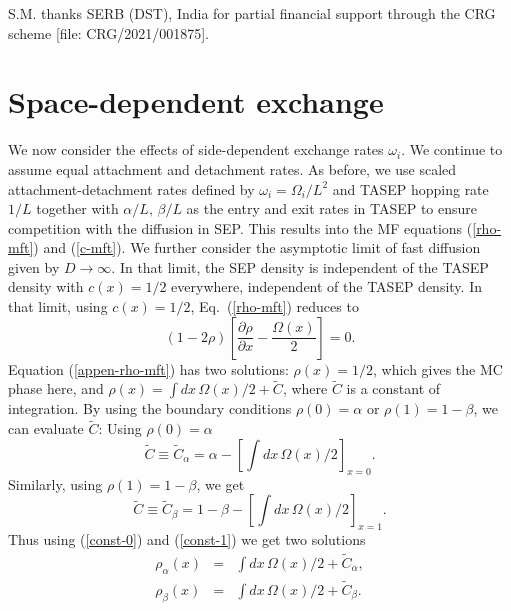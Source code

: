 \documentclass[aps,pre,twocolumn,superscriptaddress,amsmath,amssymb,longbibliography,floatfix]{revtex4}
\begin{document}
{S.M. thanks SERB (DST), India for partial financial support through the CRG scheme [file: CRG/2021/001875].

\appendix

\section{Space-dependent exchange}

We now consider the effects of side-dependent exchange rates $\omega_i$. {We continue to assume equal attachment and detachment rates. As before, we use scaled attachment-detachment rates defined by $\omega_i=\Omega_i/L^2$ and TASEP hopping rate $1/L$ together with $\alpha/L,\,\beta/L$ as the entry and exit rates in TASEP to ensure competition with the diffusion in SEP}. This results into the MF equations (\ref{rho-mft}) and (\ref{c-mft}). We further consider the asymptotic limit of fast diffusion given by $D\rightarrow \infty$. In that limit, the SEP density is independent of the TASEP density with $c(x)=1/2$ everywhere, independent of the TASEP density. In that limit, using $c(x)=1/2$, Eq.~(\ref{rho-mft}) reduces to
\begin{equation}
 (1-2\rho)\left[\frac{\partial\rho}{\partial x}- \frac{\Omega(x)}{2}\right]=0. \label{appen-rho-mft}
\end{equation}
Equation (\ref{appen-rho-mft}) has two solutions: $\rho(x)=1/2$, which gives the MC phase here, and $\rho(x)=\int dx\, \Omega(x)/2 + \tilde C$, where $\tilde C$ is a constant of integration. By using the boundary conditions $\rho(0)=\alpha$ or $\rho(1)=1-\beta$, we can evaluate $\tilde C$: Using $\rho(0)=\alpha$
\begin{equation}
 \tilde C\equiv \tilde C_\alpha = \alpha - \left[\int dx \,\Omega(x)/2\right]_{x=0}.\label{const-0}
\end{equation}
Similarly, using $\rho(1)=1-\beta$, we get
\begin{equation}
 \tilde C\equiv \tilde C_\beta = 1-\beta - \left[\int dx \,\Omega(x)/2\right]_{x=1}.\label{const-1}
\end{equation}
Thus using (\ref{const-0}) and (\ref{const-1}) we get two solutions
\begin{eqnarray}
 \rho_\alpha(x)&=&\int dx \,\Omega(x)/2+\tilde C_\alpha,\\
 \rho_\beta(x)&=&\int dx \,\Omega(x)/2+\tilde C_\beta.
\end{eqnarray}
}
\end{document}
